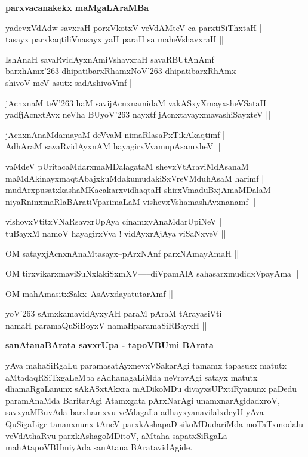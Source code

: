 {\bigskip
\noindent
{\large\bf parxvacanakekx maMgaLAraMBa}}\label{page102}
\begin{description}
{\bf
\item [1)] yadevxVdAdw savxraH porxVkotxV veVdAMteV ca parxtiSiThxtaH |\\\label{102} tasayx parxkaqtiliVnasayx yaH paraH sa maheVshavxraH ||
\item [2)] IshAnaH savaRvidAyxnAmiVshavxraH savaRBUtAnAmf |\\ barxhAmx\char'263 dhipatibarxRhamxNoV\char'263 dhipatibarxRhAmx\\ shivoV meV asutx sadAshivoVmf ||
\item [3)] jAcnxnaM teV\char'263 haM savijAcnxnamidaM\label{72} vakASxyXmayxsheVSataH |\\ yadfjAcnxtAvx neVha BUyoV\char'263 nayxtf jAcnxtavayxmavashiSayxteV ||
\item [4)] jAcnxnAnaMdamayaM deVvaM nimaRlasaPxTikAkaqtimf |\\ AdhAraM savaRvidAyxnAM hayagirxVvamupAsamxheV ||\label{102}
\item [5)] vaMdeV pUritacaMdarxmaMDalagataM shevxVtAraviMdAsanaM\\ maMdAkinayxmaqtAbajxkuMdakumudakiSxVreVMduhAsaM harimf |\\ mudArxpusatxkashaMKacakarxvidhaqtaH shirxVmaduBxjAmaMDalaM\\ niyaRninxmaRlaBAratiVparimaLaM vishevxVshamashAvxnanamf ||
\item [6)] vishovxVtitxVNaRsavxrUpAya cinamxyAnaMdarUpiNeV |\\\label{102} tuBayxM namoV hayagirxVva ! vidAyxrAjAya viSaNxveV ||
\item [7)] OM satayxjAcnxnAnaMtasayx--pArxNAnf parxNAmayAmaH ||\label{81}\label{103}
\item [8)] OM tirxvikarxmaviSuNxlakiSxmXV-----diVpamAlA sahasarxmudidxVpayAma ||\label{103}
\item [9)] OM mahAmasitxSakx--AsAvxdayatutarAmf ||\label{103}
\item [10)] yoV\char'263 sAmxkamavidAyxyAH paraM pAraM tArayasiVti\\\label{103} namaH paramaQuSiBoyxV namaHparamaSiRBayxH ||}
\end{description}

\medskip

{\noindent
{\large\bf sanAtanaBArata savxrUpa - tapoVBUmi BArata}}\label{page103}
\medskip

\noindent
yAva mahaSiRgaLu paramasatAyxnevxVSakarAgi tamamx tapasusx matutx aMtadaqRSiTxgaLeMba sAdhanagaLiMda neVra\-vAgi satayx matutx dhamaRgaLanunx sAkASxtAkxra mADikoMDu divayx\-sUPxtiRyanunx paDedu paramAnaMda Barita\-rAgi Atamxgata pArxNarAgi unamxnarAgidadxroV, savxyaMBuvAda barxhamxvu veVda\-gaLa adhayxyanavilalxdeyU yAva QuSigaLige tananxnunx tAneV parxkAshapaDisikoMDuda\-riMda moTaTxmodalu veVdAthaRvu parxkAshagoM\-DitoV, aMtaha sapatxSiRgaLa mahAtapoVBUmiyAda sanAtana BAratavidAgide.

